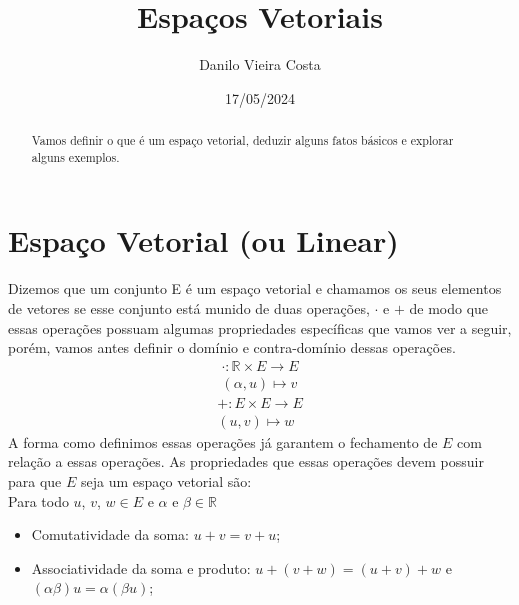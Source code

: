 \documentclass[12pt]{article}
\title{Espaços Vetoriais}
\author{Danilo Vieira Costa}
\date{17/05/2024}
\begin{document}
\maketitle

\begin{abstract}
Vamos definir o que é um espaço vetorial, deduzir alguns fatos básicos e explorar alguns exemplos.
\end{abstract}

\section{Espaço Vetorial (ou Linear)}
Dizemos que um conjunto E é um espaço vetorial e chamamos os seus elementos de vetores se esse conjunto está munido de duas operações, $\cdot$ e $+$ de modo que essas operações possuam algumas propriedades específicas que vamos ver a seguir, porém, vamos antes definir o domínio e contra-domínio dessas operações.
$$
\begin{matrix}
    \cdot : \mathbb{R} \times E\longrightarrow E \\
    \left( \alpha , u\right) \longmapsto v
\end{matrix}
$$
$$
\begin{matrix}
    +: E \times E \longrightarrow E \\\left(u,v\right) \longmapsto w
\end{matrix}  
$$
A forma como definimos essas operações já garantem o fechamento de $E$ com relação a essas operações.
As propriedades que essas operações devem possuir para que $E$ seja um espaço vetorial são:\\
Para todo $u$, $v$, $w \in E$ e  $\alpha$ e $\beta \in \mathbb{R}$
\begin{itemize}
    \item Comutatividade da soma: $u+v=v+u$;
    \item Associatividade da soma e produto: $u+\left(v+w\right)=\left(u+v\right)+w$ e $\left(\alpha \beta \right)u=\alpha\left(\beta u\right)$;
\end{itemize}
\end{document}
